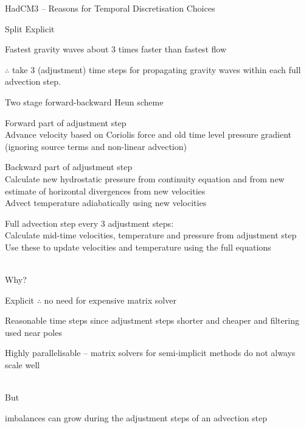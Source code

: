 \begin{slide}{HadCM3 -- Reasons for Temporal Discretisation Choices}

\begin{list1}

\item Split Explicit
\begin{list2}
    \item Fastest gravity waves about 3 times faster than fastest flow
    \item $\therefore$ take 3 (adjustment) time steps for propagating gravity waves within each full advection step.
\end{list2}

\item Two stage forward-backward Heun scheme
\begin{list2}
    \item Forward part of adjustment step \\
        Advance velocity based on Coriolis force and old time level pressure gradient \\(ignoring source terms and non-linear advection)
    \item Backward part of adjustment step \\
        Calculate new hydrostatic pressure from continuity equation and from new estimate of horizontal divergences from new velocities \\
        Advect temperature adiabatically using new velocities
    \item Full advection step every 3 adjustment steps:\\
        Calculate mid-time velocities, temperature and pressure from adjustment step\\
        Use these to update velocities and temperature using the full equations
\end{list2}
\end{list1}

\ \\Why?
\begin{list0}
\item Explicit $\therefore$ no need for expensive matrix solver
\item Reasonable time steps since adjustment steps shorter and cheaper and filtering used near poles
\item Highly parallelisable -- matrix solvers for semi-implicit methods do not always scale well
\end{list0}

\ \\But
\begin{list0}
\item imbalances can grow during the adjustment steps of an advection step
\end{list0}


\end{slide}
